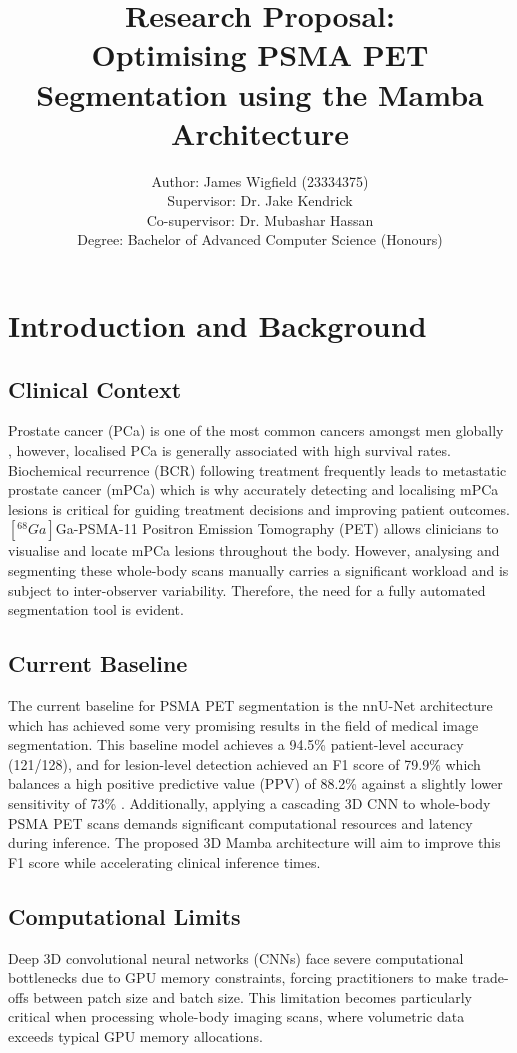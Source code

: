 \documentclass{article}
\title{Research Proposal: \\
        Optimising PSMA PET Segmentation using the Mamba Architecture}
\author{Author: James Wigfield (23334375)\\ 
        Supervisor: Dr. Jake Kendrick \\ 
        Co-supervisor: Dr. Mubashar Hassan \\ 
        Degree: Bachelor of Advanced Computer Science (Honours)}
\date{\monthname[\the\month] \the\year}
\begin{document}
\maketitle

\section{Introduction and Background}
\subsection{Clinical Context}
Prostate cancer (PCa) is one of the most common cancers amongst men globally \cite{Bray2024GlobalCS}, however, 
localised PCa is generally associated with high survival rates. Biochemical recurrence (BCR) following treatment
frequently leads to metastatic prostate cancer (mPCa) which is why accurately detecting and localising mPCa 
lesions is critical for guiding treatment decisions and improving patient outcomes. $[^{68}Ga]$Ga-PSMA-11 Positron 
Emission Tomography (PET) allows clinicians to visualise and locate mPCa lesions throughout the body. However, 
analysing and segmenting these whole-body scans manually carries a significant workload and is subject to inter-observer
variability. Therefore, the need for a fully automated segmentation tool is evident.

\subsection{Current Baseline}
The current baseline for PSMA PET segmentation is the nnU-Net architecture which has achieved some very promising
results in the field of medical image segmentation. This baseline model achieves a 94.5\% patient-level accuracy (121/128),
and for lesion-level detection achieved an F1 score of 79.9\% which balances a high positive predictive value (PPV) of 88.2\% 
against a slightly lower sensitivity of 73\% \cite{kendrick2022fully}. Additionally, applying a cascading 3D CNN to whole-body
PSMA PET scans demands significant computational resources and latency during inference. The proposed 3D Mamba architecture 
will aim to improve this F1 score while accelerating clinical inference times.


\subsection{Computational Limits}
Deep 3D convolutional neural networks (CNNs) face severe computational bottlenecks due to GPU memory constraints, forcing 
practitioners to make trade-offs between patch size and batch size. This limitation becomes particularly critical when processing 
whole-body imaging scans, where volumetric data exceeds typical GPU memory allocations. 
\end{document}
